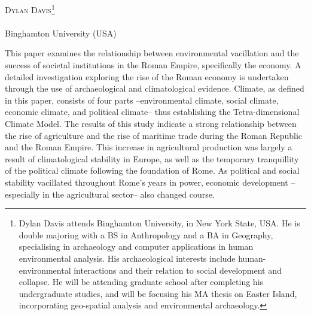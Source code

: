 \openingarticle
\def\ppages{\pagerange{davis:firstpage}{davis:lastpage}}
\def\authormail{ddavis17@binghamton.edu}
\def\shorttitle{An Analysis of the Roman Agroeconomy}
\def\maintitle{Tetra-dimensional Climate and its Effects  
	on the Roman State: An Archaeological Analysis of the 
	Roman Agroeconomy}
\def\shortauthor{Dylan Davis}
\def\thanknote{\footnote{Dylan Davis attends Binghamton University, in New York State, USA. He is double majoring with a BS in Anthropology and a BA in Geography, specialising in archaeology and computer applications in human environmental analysis. His archaeological interests include human-environmental interactions and their relation to social development and collapse. He will be attending graduate school after completing his undergraduate studies, and will be focusing his MA thesis on Easter Island, incorporating geo-spatial analysis and environmental archaeology.}}
\def\affiliation{Binghamton University (USA)}
\begin{center}
	{\Large\scshape\shortauthor \thanknote}\\[1em]
	\email \\%
	\affiliation
\end{center}
\vspace{3em}
\midarticle
\label{davis:firstpage}

	\begin{myabstract}
		\noindent   This paper examines the relationship between environmental vacillation and the success of societal institutions in the Roman Empire, specifically the economy. A detailed investigation exploring the rise of the Roman economy is undertaken through the use of archaeological and climatological evidence. Climate, as defined in this paper, consists of four parts –environmental climate, social climate, economic climate, and political climate– thus establishing the Tetra-dimensional Climate Model. The results of this study indicate a strong relationship between the rise of agriculture and the rise of maritime trade during the Roman Republic and the Roman Empire. This increase in agricultural production was largely a result of climatological stability in Europe, as well as the temporary tranquillity of the political climate following the foundation of Rome. As political and social stability vacillated throughout Rome’s years in power, economic development –especially in the agricultural sector– also changed course.\\[1em]
	\end{myabstract}
	

